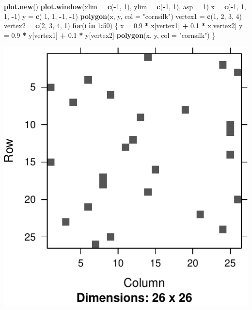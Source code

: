\documentclass[]{book}
\newenvironment{Shaded}{\begin{snugshade}}{\end{snugshade}}
\newcommand{\KeywordTok}[1]{\textcolor[rgb]{0.13,0.29,0.53}{\textbf{#1}}}
\newcommand{\DataTypeTok}[1]{\textcolor[rgb]{0.13,0.29,0.53}{#1}}
\newcommand{\DecValTok}[1]{\textcolor[rgb]{0.00,0.00,0.81}{#1}}
\newcommand{\FloatTok}[1]{\textcolor[rgb]{0.00,0.00,0.81}{#1}}
\newcommand{\StringTok}[1]{\textcolor[rgb]{0.31,0.60,0.02}{#1}}
\newcommand{\ControlFlowTok}[1]{\textcolor[rgb]{0.13,0.29,0.53}{\textbf{#1}}}
\newcommand{\OperatorTok}[1]{\textcolor[rgb]{0.81,0.36,0.00}{\textbf{#1}}}
\newcommand{\NormalTok}[1]{#1}
\theoremstyle{definition}
\theoremstyle{definition}
\theoremstyle{definition}
\theoremstyle{remark}
\begin{document}
\begin{Shaded}
\begin{Highlighting}[]
\KeywordTok{plot.new}\NormalTok{()}
\KeywordTok{plot.window}\NormalTok{(}\DataTypeTok{xlim =} \KeywordTok{c}\NormalTok{(}\OperatorTok{-}\DecValTok{1}\NormalTok{, }\DecValTok{1}\NormalTok{), }\DataTypeTok{ylim =} \KeywordTok{c}\NormalTok{(}\OperatorTok{-}\DecValTok{1}\NormalTok{, }\DecValTok{1}\NormalTok{), }\DataTypeTok{asp =} \DecValTok{1}\NormalTok{)}
\NormalTok{x =}\StringTok{ }\KeywordTok{c}\NormalTok{(}\OperatorTok{-}\DecValTok{1}\NormalTok{, }\DecValTok{1}\NormalTok{, }\DecValTok{1}\NormalTok{, }\OperatorTok{-}\DecValTok{1}\NormalTok{)}
\NormalTok{y =}\StringTok{ }\KeywordTok{c}\NormalTok{( }\DecValTok{1}\NormalTok{, }\DecValTok{1}\NormalTok{, }\OperatorTok{-}\DecValTok{1}\NormalTok{, }\OperatorTok{-}\DecValTok{1}\NormalTok{)}
\KeywordTok{polygon}\NormalTok{(x, y, }\DataTypeTok{col =} \StringTok{"cornsilk"}\NormalTok{)}
\NormalTok{vertex1 =}\StringTok{ }\KeywordTok{c}\NormalTok{(}\DecValTok{1}\NormalTok{, }\DecValTok{2}\NormalTok{, }\DecValTok{3}\NormalTok{, }\DecValTok{4}\NormalTok{)}
\NormalTok{vertex2 =}\StringTok{ }\KeywordTok{c}\NormalTok{(}\DecValTok{2}\NormalTok{, }\DecValTok{3}\NormalTok{, }\DecValTok{4}\NormalTok{, }\DecValTok{1}\NormalTok{)}
\ControlFlowTok{for}\NormalTok{(i }\ControlFlowTok{in} \DecValTok{1}\OperatorTok{:}\DecValTok{50}\NormalTok{) \{}
\NormalTok{    x =}\StringTok{ }\FloatTok{0.9} \OperatorTok{*}\StringTok{ }\NormalTok{x[vertex1] }\OperatorTok{+}\StringTok{ }\FloatTok{0.1} \OperatorTok{*}\StringTok{ }\NormalTok{x[vertex2]}
\NormalTok{    y =}\StringTok{ }\FloatTok{0.9} \OperatorTok{*}\StringTok{ }\NormalTok{y[vertex1] }\OperatorTok{+}\StringTok{ }\FloatTok{0.1} \OperatorTok{*}\StringTok{ }\NormalTok{y[vertex2]}
    \KeywordTok{polygon}\NormalTok{(x, y, }\DataTypeTok{col =} \StringTok{"cornsilk"}\NormalTok{)}
\NormalTok{\}}
\end{Highlighting}
\end{Shaded}

\includegraphics[width=0.5\linewidth]{Rcourse_files/figure-latex/unnamed-chunk-281-1}
\end{document}

